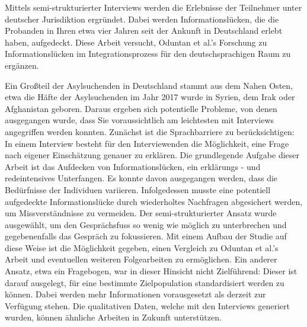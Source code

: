


Mittels semi-strukturierter Interviews werden die Erlebnisse der Teilnehmer unter deutscher Jurisdiktion ergr\"undet. Dabei werden Informationsl\"ucken, die die Probanden in Ihren etwa vier Jahren seit der Ankunft in Deutschland erlebt haben, aufgedeckt.\newline
Diese Arbeit versucht, Oduntan et al.'s Forschung zu Informationslücken im Integrationsprozess für den deutschsprachigen Raum zu ergänzen.\newline

Ein Gro\ss{}teil der Asylsuchenden in Deutschland stammt aus dem Nahen Osten, etwa die H\"afte der Asylsuchenden im Jahr 2017 wurde in Syrien, dem Irak oder Afghanistan geboren\cite{asylum2017seekers}. Daraus ergeben sich potentielle Probleme, von denen ausgegangen wurde, dass Sie voraussichtlich am leichtesten mit Interviews angegriffen werden konnten.
Zun\"achst ist die Sprachbarriere zu ber\"ucksichtigen: In einem Interview besteht f\"ur den Interviewenden die M\"oglichkeit, eine Frage nach eigener Einsch\"atzung genauer zu erkl\"aren.
Die grundlegende Aufgabe dieser Arbeit ist das Aufdecken von Informationsl\"ucken, ein erkl\"arungs - und redeintensives Unterfangen. Es konnte davon ausgegangen werden, dass die Bed\"urfnisse der Individuen variieren. Infolgedessen musste eine potentiell aufgedeckte Informationsl\"ucke durch wiederholtes Nachfragen abgesichert werden, um Missverst\"andnisse zu vermeiden.\newline
Der semi-strukturierter Ansatz wurde ausgew\"ahlt, um den Gespr\"achsfuss so wenig wie m\"oglich zu unterbrechen und gegebenenfalls das Gespr\"ach zu fokussieren.\newline
Mit einem Aufbau der Studie auf diese Weise ist die M\"oglichkeit gegeben, einen Vergleich zu Oduntan et al.'s Arbeit und eventuellen weiteren Folgearbeiten zu ermöglichen.\newline
Ein anderer Ansatz, etwa ein Fragebogen, war in dieser Hinsicht nicht Zielf\"uhrend: Dieser ist darauf ausgelegt, f\"ur eine bestimmte Zielpopulation standardisiert werden zu k\"onnen. Dabei werden mehr Informationen vorausgesetzt als derzeit zur Verf\"ugung stehen.\newline
Die qualitativen Daten, welche mit den Interviews generiert wurden, k\"onnen \"ahnliche Arbeiten in Zukunft unterst\"utzen.\newline


